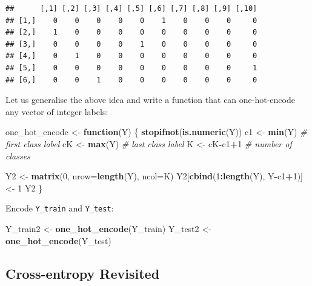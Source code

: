 \documentclass[10pt,b5paper,krantz1]{krantz}
\newenvironment{Shaded}{\begin{snugshade}}{\end{snugshade}}
\newcommand{\CommentTok}[1]{\textcolor[rgb]{0.37,0.37,0.37}{\textit{#1}}}
\newcommand{\ControlFlowTok}[1]{\textcolor[rgb]{0.27,0.27,0.27}{\textbf{#1}}}
\newcommand{\DataTypeTok}[1]{\textcolor[rgb]{0.27,0.27,0.27}{#1}}
\newcommand{\DecValTok}[1]{\textcolor[rgb]{0.06,0.06,0.06}{#1}}
\newcommand{\KeywordTok}[1]{\textcolor[rgb]{0.27,0.27,0.27}{\textbf{#1}}}
\newcommand{\NormalTok}[1]{#1}
\newcommand{\OperatorTok}[1]{\textcolor[rgb]{0.43,0.43,0.43}{\textbf{#1}}}
\newcommand{\StringTok}[1]{\textcolor[rgb]{0.5,0.5,0.5}{#1}}
\begin{document}
\begin{verbatim}
##      [,1] [,2] [,3] [,4] [,5] [,6] [,7] [,8] [,9] [,10]
## [1,]    0    0    0    0    0    1    0    0    0     0
## [2,]    1    0    0    0    0    0    0    0    0     0
## [3,]    0    0    0    0    1    0    0    0    0     0
## [4,]    0    1    0    0    0    0    0    0    0     0
## [5,]    0    0    0    0    0    0    0    0    0     1
## [6,]    0    0    1    0    0    0    0    0    0     0
\end{verbatim}

Let us generalise the above idea and write a function
that can one-hot-encode any vector of integer labels:

\begin{Shaded}
\begin{Highlighting}[]
\NormalTok{one_hot_encode <-}\StringTok{ }\ControlFlowTok{function}\NormalTok{(Y) \{}
    \KeywordTok{stopifnot}\NormalTok{(}\KeywordTok{is.numeric}\NormalTok{(Y))}
\NormalTok{    c1 <-}\StringTok{ }\KeywordTok{min}\NormalTok{(Y) }\CommentTok{# first class label}
\NormalTok{    cK <-}\StringTok{ }\KeywordTok{max}\NormalTok{(Y) }\CommentTok{# last class label}
\NormalTok{    K <-}\StringTok{ }\NormalTok{cK}\OperatorTok{-}\NormalTok{c1}\OperatorTok{+}\DecValTok{1} \CommentTok{# number of classes}

\NormalTok{    Y2 <-}\StringTok{ }\KeywordTok{matrix}\NormalTok{(}\DecValTok{0}\NormalTok{, }\DataTypeTok{nrow=}\KeywordTok{length}\NormalTok{(Y), }\DataTypeTok{ncol=}\NormalTok{K)}
\NormalTok{    Y2[}\KeywordTok{cbind}\NormalTok{(}\DecValTok{1}\OperatorTok{:}\KeywordTok{length}\NormalTok{(Y), Y}\OperatorTok{-}\NormalTok{c1}\OperatorTok{+}\DecValTok{1}\NormalTok{)] <-}\StringTok{ }\DecValTok{1}
\NormalTok{    Y2}
\NormalTok{\}}
\end{Highlighting}
\end{Shaded}

Encode \texttt{Y\_train} and \texttt{Y\_test}:

\begin{Shaded}
\begin{Highlighting}[]
\NormalTok{Y_train2 <-}\StringTok{ }\KeywordTok{one_hot_encode}\NormalTok{(Y_train)}
\NormalTok{Y_test2 <-}\StringTok{ }\KeywordTok{one_hot_encode}\NormalTok{(Y_test)}
\end{Highlighting}
\end{Shaded}

\hypertarget{cross-entropy-revisited}{%
\subsection{Cross-entropy Revisited}\label{cross-entropy-revisited}}
\end{document}
